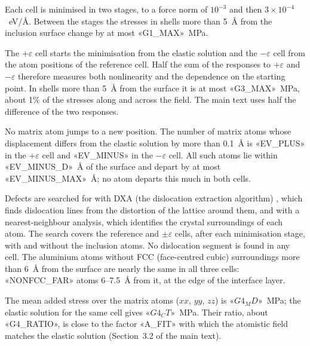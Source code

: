 Each cell is minimised in two stages, to a force norm of $10^{-3}$ and then
$3\times10^{-4}$~eV/\AA. Between the stages the stresses in shells more than
5~\AA{} from the inclusion surface change by at most «G1_MAX»~MPa.

The $+\varepsilon$ cell starts the minimisation from the elastic solution and
the $-\varepsilon$ cell from the atom positions of the reference cell. Half
the sum of the responses to $+\varepsilon$ and $-\varepsilon$ therefore
measures both nonlinearity and the dependence on the starting point. In
shells more than 5~\AA{} from the surface it is at most «G3_MAX»~MPa, about
1\% of the stresses along and across the field. The main text uses half
the difference of the two responses.

No matrix atom jumps to a new position. The number of matrix atoms whose
displacement differs from the elastic solution by more than 0.1~\AA{} is
«EV_PLUS» in the $+\varepsilon$ cell and «EV_MINUS» in the $-\varepsilon$ cell.
All such atoms lie within «EV_MINUS_D»~\AA{} of the surface and depart by at
most «EV_MINUS_MAX»~\AA; no atom departs this much in both cells.

Defects are searched for with DXA (the dislocation extraction algorithm)
\cite{Stukowski2012DXA}, which finds dislocation lines from the distortion of
the lattice around them, and with a nearest-neighbour analysis, which
identifies the crystal surroundings of each atom. The search covers the
reference and $\pm\varepsilon$ cells, after each minimisation stage, with and
without the inclusion atoms. No dislocation segment is found in any cell. The
aluminium atoms without FCC (face-centred cubic) surroundings more than 6~\AA{}
from the surface are nearly the same in all three cells: «NONFCC_FAR» atoms
6--7.5~\AA{} from it, at the edge of the interface layer.

The mean added stress over the matrix atoms ($xx$, $yy$, $zz$) is
$«G4_MD»$~MPa; the elastic solution for the same cell gives $«G4_CT»$~MPa.
Their ratio, about «G4_RATIO», is close to the factor «A_FIT» with which the
atomistic field matches the elastic solution (Section~3.2 of the main text).

